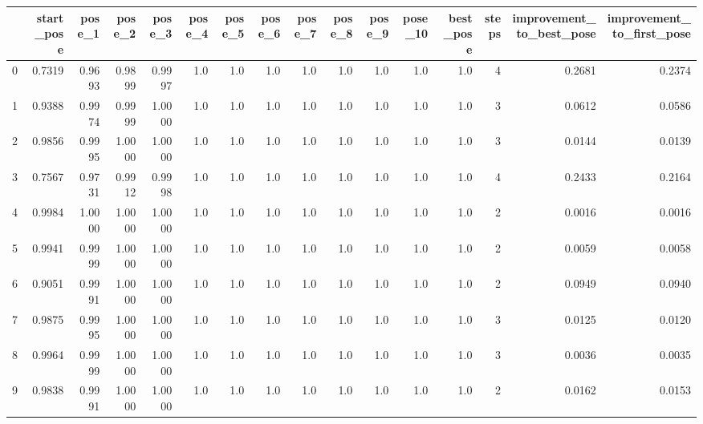 \begin{tabular}{lrrrrrrrrrrrrrrr}
\toprule
{} &  start\_pose &  pose\_1 &  pose\_2 &  pose\_3 &  pose\_4 &  pose\_5 &  pose\_6 &  pose\_7 &  pose\_8 &  pose\_9 &  pose\_10 &  best\_pose &  steps &  improvement\_to\_best\_pose &  improvement\_to\_first\_pose \\
\midrule
0 &      0.7319 &  0.9693 &  0.9899 &  0.9997 &     1.0 &     1.0 &     1.0 &     1.0 &     1.0 &     1.0 &      1.0 &        1.0 &      4 &                    0.2681 &                     0.2374 \\
1 &      0.9388 &  0.9974 &  0.9999 &  1.0000 &     1.0 &     1.0 &     1.0 &     1.0 &     1.0 &     1.0 &      1.0 &        1.0 &      3 &                    0.0612 &                     0.0586 \\
2 &      0.9856 &  0.9995 &  1.0000 &  1.0000 &     1.0 &     1.0 &     1.0 &     1.0 &     1.0 &     1.0 &      1.0 &        1.0 &      3 &                    0.0144 &                     0.0139 \\
3 &      0.7567 &  0.9731 &  0.9912 &  0.9998 &     1.0 &     1.0 &     1.0 &     1.0 &     1.0 &     1.0 &      1.0 &        1.0 &      4 &                    0.2433 &                     0.2164 \\
4 &      0.9984 &  1.0000 &  1.0000 &  1.0000 &     1.0 &     1.0 &     1.0 &     1.0 &     1.0 &     1.0 &      1.0 &        1.0 &      2 &                    0.0016 &                     0.0016 \\
5 &      0.9941 &  0.9999 &  1.0000 &  1.0000 &     1.0 &     1.0 &     1.0 &     1.0 &     1.0 &     1.0 &      1.0 &        1.0 &      2 &                    0.0059 &                     0.0058 \\
6 &      0.9051 &  0.9991 &  1.0000 &  1.0000 &     1.0 &     1.0 &     1.0 &     1.0 &     1.0 &     1.0 &      1.0 &        1.0 &      2 &                    0.0949 &                     0.0940 \\
7 &      0.9875 &  0.9995 &  1.0000 &  1.0000 &     1.0 &     1.0 &     1.0 &     1.0 &     1.0 &     1.0 &      1.0 &        1.0 &      3 &                    0.0125 &                     0.0120 \\
8 &      0.9964 &  0.9999 &  1.0000 &  1.0000 &     1.0 &     1.0 &     1.0 &     1.0 &     1.0 &     1.0 &      1.0 &        1.0 &      3 &                    0.0036 &                     0.0035 \\
9 &      0.9838 &  0.9991 &  1.0000 &  1.0000 &     1.0 &     1.0 &     1.0 &     1.0 &     1.0 &     1.0 &      1.0 &        1.0 &      2 &                    0.0162 &                     0.0153 \\
\bottomrule
\end{tabular}

